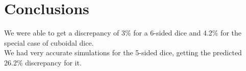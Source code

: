 \section{Conclusions}
We were able to get a discrepancy of 3\% for a 6-sided dice and 4.2\% for the special case of cuboidal dice.\\
We had very accurate simulations for the 5-sided dice, getting the predicted 26.2\% discrepancy for it.\\

